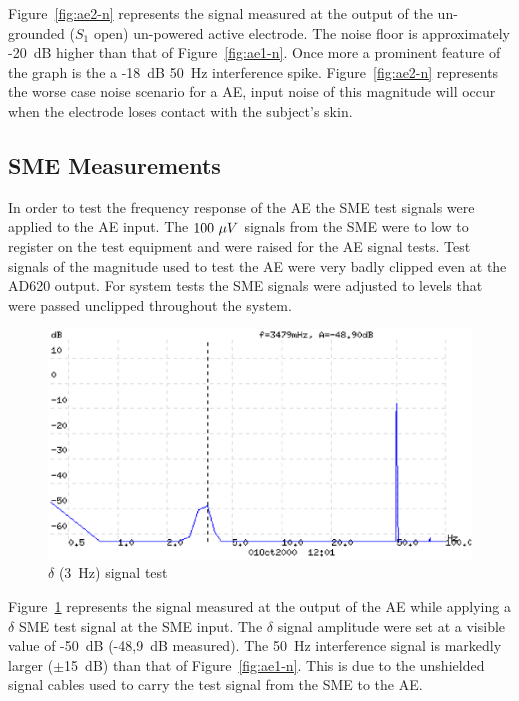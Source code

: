 Figure~\ref{fig:ae2-n} represents the signal measured at the output of
the un-grounded ($S_1$ open) un-powered active electrode. The noise
floor is approximately -20~dB higher than that of
Figure~\ref{fig:ae1-n}. Once more a prominent feature of the graph is
the a -18~dB 50~Hz interference spike. Figure~\ref{fig:ae2-n}
represents the worse case noise scenario for a AE, input noise of this
magnitude will occur when the electrode loses contact with the
subject's skin.


\subsection{SME Measurements}
In order to test the frequency response of the AE the SME test signals
were applied to the AE input. The $100~\mu\/V$ signals from the SME
were to low to register on the test equipment and were raised for the
AE signal tests. Test signals of the magnitude used to test the AE
were very badly clipped even at the AD620 output. For system tests the
SME signals were adjusted to levels that were passed unclipped
throughout the system.


\begin{figure}[htbp]
\begin{center}
	\includegraphics[width=\textwidth]{AE63SME.ps}
	\caption{$\delta$ (3~Hz) signal test}
	\label{fig:ae-sme3}
\end{center}
\end{figure}

Figure~\ref{fig:ae-sme3} represents the signal measured at the output
of the AE while applying a $\delta$ SME test signal at the SME
input. The $\delta$ signal amplitude were set at a visible value of
-50~dB (-48,9~dB measured). The 50~Hz interference signal is markedly
larger ($\pm$15~dB) than that of Figure~\ref{fig:ae1-n}. This is due
to the unshielded signal cables used to carry the test signal from the
SME to the AE.


